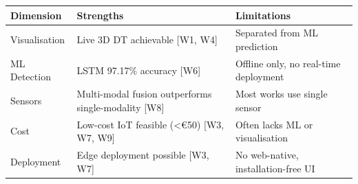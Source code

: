 
\begin{tabular}{|L{4cm}|L{4cm}|L{4cm}|}
	\hline
	\textbf{\color{white}Dimension} & \textbf{\color{white}Strengths} & \textbf{\color{white}Limitations} \\
	\hline
	Visualisation & Live 3D DT achievable [W1, W4] & Separated from ML prediction \\
	\hline
	ML Detection & LSTM 97.17\% accuracy [W6] & Offline only, no real-time deployment \\
	\hline
	Sensors & Multi-modal fusion outperforms single-modality [W8] & Most works use single sensor \\
	\hline
	Cost & Low-cost IoT feasible (<€50) [W3, W7, W9] & Often lacks ML or visualisation \\
	\hline
	Deployment & Edge deployment possible [W3, W7] & No web-native, installation-free UI \\
	\hline
\end{tabular}